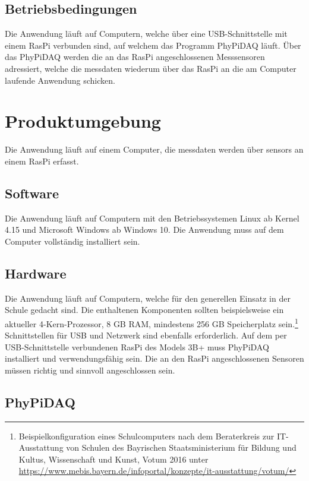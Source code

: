 \documentclass[parskip=full]{scrartcl}
\begin{document}
\subsection{Betriebsbedingungen}

Die Anwendung läuft auf Computern, welche über eine USB-Schnittstelle mit einem \gls{RasPi} verbunden sind, auf welchem das Programm \gls{PhyPiDAQ} läuft. Über das \gls{PhyPiDAQ} werden die an das \gls{RasPi} angeschlossenen Messsensoren adressiert, welche die \gls{messdaten} wiederum über das \gls{RasPi} an die am Computer laufende Anwendung schicken. 


\clearpage
\section{Produktumgebung}\label{produktumgebung}

Die Anwendung läuft auf einem Computer, die \gls{messdaten} werden über \glspl{sensor} an einem \gls{RasPi} erfasst.

\subsection{Software}

Die Anwendung läuft auf Computern mit den Betriebssystemen Linux ab Kernel 4.15 und Microsoft Windows ab Windows 10. Die Anwendung muss auf dem Computer vollständig installiert sein. 

\subsection{Hardware}

Die Anwendung läuft auf Computern, welche für den generellen Einsatz in der Schule gedacht sind.
Die enthaltenen Komponenten sollten beispielsweise ein aktueller 4-Kern-Prozessor, 8 GB RAM,
mindestens 256 GB Speicherplatz sein.\footnote{Beispielkonfiguration eines Schulcomputers nach dem Beraterkreis zur IT-Ausstattung von Schulen des Bayrischen Staatsministerium für Bildung und Kultus, Wissenschaft und Kunst, Votum 2016 unter \url{https://www.mebis.bayern.de/infoportal/konzepte/it-ausstattung/votum/}} Schnittstellen für USB und Netzwerk sind ebenfalls erforderlich. 
Auf dem per USB-Schnittstelle verbundenen \gls{RasPi} des Models 3B+ muss \gls{PhyPiDAQ} installiert und verwendungsfähig sein.
Die an den \gls{RasPi} angeschlossenen Sensoren müssen richtig und sinnvoll angeschlossen sein.

\subsection{PhyPiDAQ}
\end{document}
